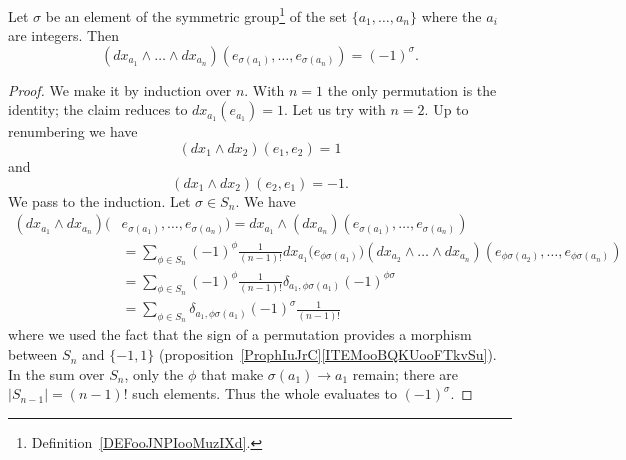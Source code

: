 \begin{lemma}
	Let \( \sigma\) be an element of the symmetric group\footnote{Definition~\ref{DEFooJNPIooMuzIXd}.} of the set \( \{ a_1,\ldots, a_n \}\) where the \( a_i\) are integers. Then
	\begin{equation}
		(dx_{a_1}\wedge\ldots \wedge dx_{a_n})(e_{\sigma(a_1)},\ldots, e_{\sigma(a_n)})=(-1)^{\sigma}.
	\end{equation}
\end{lemma}

\begin{proof}
	We make it by induction over \( n\). With \( n=1\) the only permutation is the identity; the claim reduces to \( dx_{a_1}(e_{a_1})=1\). Let us try with \( n=2\). Up to renumbering we have
	\begin{equation}
		(dx_1\wedge dx_2)(e_1,e_2)=1
	\end{equation}
	and
	\begin{equation}
		(dx_1\wedge dx_2)(e_2,e_1)=-1.
	\end{equation}
	We pass to the induction. Let \( \sigma\in S_n\). We have
	\begin{subequations}
		\begin{align}
			(dx_{a_1}\wedge dx_{a_n})( & e_{\sigma(a_1)},\ldots, e_{\sigma(a_n)})=dx_{a_1}\wedge (dx_{a_n})(e_{\sigma(a_1)},\ldots, e_{\sigma(a_n)})                                                                   \\
			                           & =\sum_{\phi\in S_n}(-1)^{\phi}\frac{1}{ (n-1)! }dx_{a_1}\big( e_{\phi\sigma(a_1)} \big)(dx_{a_2}\wedge\ldots\wedge dx_{a_n})(e_{\phi\sigma(a_2)},\ldots, e_{\phi\sigma(a_n)}) \\
			                           & =\sum_{\phi\in S_n}(-1)^{\phi}\frac{1}{ (n-1)! }\delta_{a_1,\phi\sigma(a_1)}(-1)^{\phi\sigma}                                                                                 \\
			                           & =\sum_{\phi\in S_n}\delta_{a_1,\phi\sigma(a_1)}(-1)^{\sigma}\frac{1}{ (n-1)! }
		\end{align}
	\end{subequations}
	where we used the fact that the sign of a permutation provides a morphism between \( S_n\) and \( \{ -1,1 \}\) (proposition~\ref{ProphIuJrC}\ref{ITEMooBQKUooFTkvSu}). In the sum over \( S_n\), only the \( \phi\) that make \( \sigma(a_1)\to a_1\) remain; there are \( | S_{n-1} |=(n-1)!\) such elements. Thus the whole evaluates to \( (-1)^{\sigma}\).
\end{proof}

